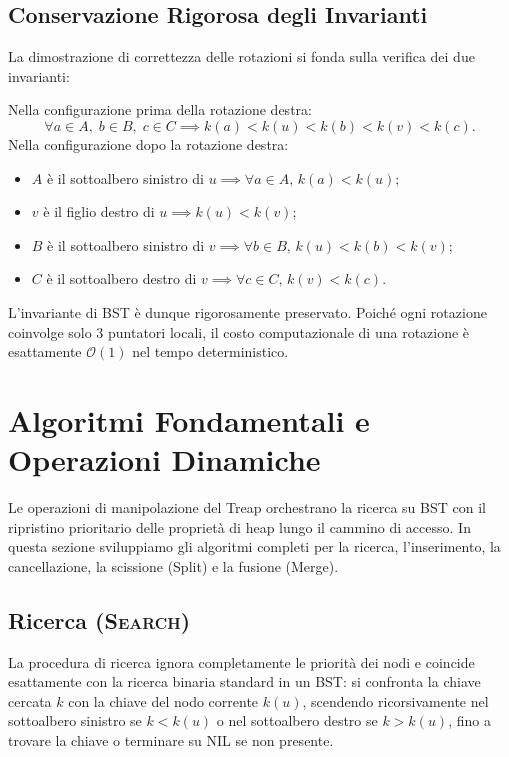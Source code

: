 \subsection{Conservazione Rigorosa degli Invarianti}
La dimostrazione di correttezza delle rotazioni si fonda sulla verifica dei due invarianti:
\begin{property}
Nella configurazione prima della rotazione destra:
\begin{equation}
  \forall a \in A, \; b \in B, \; c \in C \implies k(a) < k(u) < k(b) < k(v) < k(c).
\end{equation}
Nella configurazione dopo la rotazione destra:
\begin{itemize}
    \item $A$ \`e il sottoalbero sinistro di $u \implies \forall a \in A, \, k(a) < k(u)$;
    \item $v$ \`e il figlio destro di $u \implies k(u) < k(v)$;
    \item $B$ \`e il sottoalbero sinistro di $v \implies \forall b \in B, \, k(u) < k(b) < k(v)$;
    \item $C$ \`e il sottoalbero destro di $v \implies \forall c \in C, \, k(v) < k(c)$.
\end{itemize}
L'invariante di BST \`e dunque rigorosamente preservato. Poich\'e ogni rotazione coinvolge solo 3 puntatori locali, il costo computazionale di una rotazione \`e esattamente $\mathcal{O}(1)$ nel tempo deterministico.
\end{property}

\FloatBarrier
\section{Algoritmi Fondamentali e Operazioni Dinamiche}
\label{sec:treap-dynamic-algorithms}

Le operazioni di manipolazione del Treap orchestrano la ricerca su BST con il ripristino prioritario delle propriet\`a di heap lungo il cammino di accesso. In questa sezione sviluppiamo gli algoritmi completi per la ricerca, l'inserimento, la cancellazione, la scissione (Split) e la fusione (Merge).

\FloatBarrier
\subsection{Ricerca (\textsc{Search})}
La procedura di ricerca ignora completamente le priorit\`a dei nodi e coincide esattamente con la ricerca binaria standard in un BST: si confronta la chiave cercata $k$ con la chiave del nodo corrente $k(u)$, scendendo ricorsivamente nel sottoalbero sinistro se $k < k(u)$ o nel sottoalbero destro se $k > k(u)$, fino a trovare la chiave o terminare su NIL se non presente.

